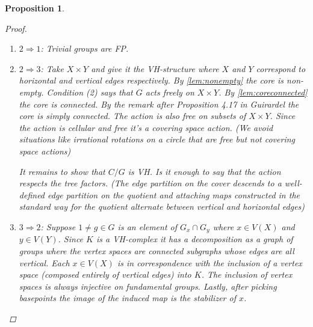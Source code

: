 \documentclass{article}
\theoremstyle{mystyle}
\newtheorem{pro}{Proposition}
\newtheorem*{claim*}{Claim}
\theoremstyle{remark}
\begin{document}
\begin{pro}
\begin{proof}
\begin{enumerate}
    \begin{claim*}
    The action of $G_{x_0}$ on $Y$ is non-trivial.
    \begin{proof}
        Suppose the action were trivial. That is, there exists some $y\in V(Y)$ such that $(G_{x_0})_y=G_{x_0}$. Hence, $G_{x_0}$ is elliptic for the action of $G$ on $Y$. By the local finiteness of $Y$, for all $x\in V(X)$ $G_x$ acts elliptically on $Y$. Hence, $\mathcal{E}(X)\subset \mathcal{E}(Y)$. Again by local finiteness we can promote this using \ref{thm:ellipticimpliesequality} to $\mathcal{E}(X) = \mathcal{E}(Y)$ which by theorem \ref{thm:forester} gives $X \sim Y$ which contradicts the fact that $X$ and $Y$ were assumed to be in different deformation spaces.
    \end{proof}
    \end{claim*}
    \item $2\Rightarrow 1$: Trivial groups are FP.
    \item $2\Rightarrow 3$: Take $X \times Y$ and give it the VH-structure where $X$ and $Y$ correspond to horizontal and vertical edges respectively. By \ref{lem:nonempty} the core is non-empty. Condition (2) says that $G$ acts freely on $X\times Y$. By \ref{lem:coreconnected} the core is connected. By the remark after Proposition 4.17 in Guirardel the core is simply connected. The action is also free on subsets of $X \times Y$. Since the action is cellular and free it's a covering space action. (We avoid situations like irrational rotations on a circle that are free but not covering space actions) 
    
    It remains to show that $C/G$ is VH. Is it enough to say that the action respects the tree factors. (The edge partition on the cover descends to a well-defined edge partition on the quotient and attaching maps constructed in the standard way for the quotient alternate between vertical and horizontal edges)
    
\item $3\Rightarrow 2$: Suppose $1\neq g \in G$ is an element of $G_x\cap G_y$ where $x \in V(X)$ and $y\in V(Y)$. Since $K$ is a VH-complex it has a decomposition as a graph of groups where the vertex spaces are connected subgraphs whose edges are all vertical. Each $x \in V(X)$ is in correspondence with the inclusion of a vertex space (composed entirely of vertical edges) into $K$. The inclusion of vertex spaces is always injective on fundamental groups. Lastly, after picking basepoints the image of the induced map is the stabilizer of $x$.
    

\end{enumerate}
\end{proof}
\end{pro}
\end{document}
